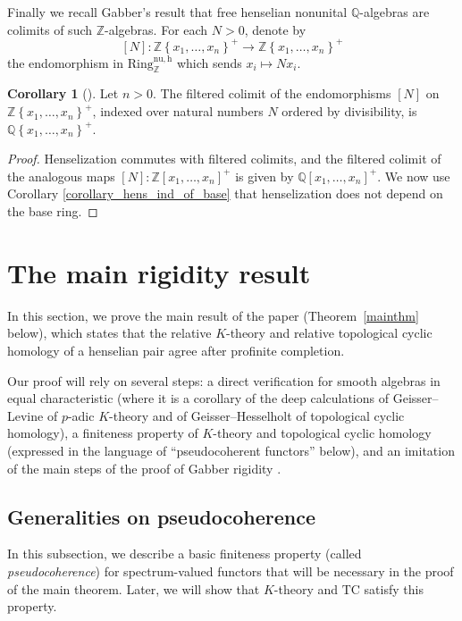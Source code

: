 \documentclass{amsart}
\theoremstyle{definition}
\newtheorem{corollary}[definition]{Corollary}
\newcommand{\TC}{\mathrm{TC}}
\newcommand{\nuzh}{\mathrm{Ring}^{\mathrm{nu,h}}}
\begin{document}
Finally we recall Gabber's result that free henselian nonunital $\mathbb Q$-algebras are colimits of such $\mathbb Z$-algebras. For each $N>0$, denote by \[[N]: \mathbb{Z}\left\{x_1,
\dots, x_n\right\}^+ \to \mathbb{Z}\left\{x_1,
\dots, x_n\right\}^+\] the endomorphism in $\nuzh_{\mathbb Z}$ which sends $x_i \mapsto Nx_i$.

\begin{corollary}[{\cite[Prop.~3]{gabber}}] 
\label{rationalhens}
Let $n > 0$. The filtered colimit of the endomorphisms $[N]$ on $\mathbb{Z}\left\{x_1,
\dots, x_n\right\}^+$, indexed over natural numbers $N$ ordered by divisibility, is
$\mathbb{Q}\left\{x_1, \dots, x_n\right\}^+$. 
\end{corollary} 
\begin{proof} 
Henselization commutes with filtered colimits, and the filtered colimit of
the analogous maps $[N]: \mathbb{Z}[x_1, \dots, x_n]^+$ is given by
$\mathbb{Q}[x_1, \dots, x_n]^+$. We now use Corollary \ref{corollary_hens_ind_of_base} that henselization does
not depend on the base ring. 
\end{proof} 

\label{sec:kanext}

\section{The main rigidity result}
In this section, we prove the main result of the paper (Theorem~\ref{mainthm}
below), which states that the relative $K$-theory and relative topological cyclic homology of a henselian pair agree after profinite completion.

Our proof will rely on several steps: a direct verification for smooth algebras in equal characteristic
(where it is a corollary of the deep calculations of Geisser--Levine \cite{GL} of
$p$-adic $K$-theory and of Geisser--Hesselholt \cite{GH} of topological cyclic
homology), a finiteness property of $K$-theory and topological cyclic homology (expressed in the language of
``pseudocoherent functors'' below), and an imitation of the main steps of
the proof of 
Gabber rigidity \cite{gabber}. 



\subsection{Generalities on pseudocoherence}
In this subsection, we 
describe a basic finiteness property (called \emph{pseudocoherence}) for spectrum-valued functors
that will be necessary in the proof of the main theorem. Later, we will show
that $K$-theory and $\TC$ satisfy this property. 
\end{document}
